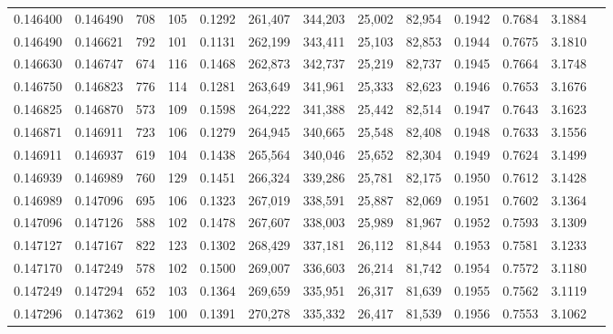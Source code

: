 \begin{tabular}{rrrrrrrrrrrrr}
0.146400 & 0.146490 &   708 & 105 &                                     0.1292 & 261,407 & 344,203 &  25,002 &  82,954 & 0.1942 & 0.7684 & 3.1884 \\
0.146490 & 0.146621 &   792 & 101 &                                     0.1131 & 262,199 & 343,411 &  25,103 &  82,853 & 0.1944 & 0.7675 & 3.1810 \\
0.146630 & 0.146747 &   674 & 116 &                                     0.1468 & 262,873 & 342,737 &  25,219 &  82,737 & 0.1945 & 0.7664 & 3.1748 \\
0.146750 & 0.146823 &   776 & 114 &                                     0.1281 & 263,649 & 341,961 &  25,333 &  82,623 & 0.1946 & 0.7653 & 3.1676 \\
0.146825 & 0.146870 &   573 & 109 &                                     0.1598 & 264,222 & 341,388 &  25,442 &  82,514 & 0.1947 & 0.7643 & 3.1623 \\
0.146871 & 0.146911 &   723 & 106 &                                     0.1279 & 264,945 & 340,665 &  25,548 &  82,408 & 0.1948 & 0.7633 & 3.1556 \\
0.146911 & 0.146937 &   619 & 104 &                                     0.1438 & 265,564 & 340,046 &  25,652 &  82,304 & 0.1949 & 0.7624 & 3.1499 \\
0.146939 & 0.146989 &   760 & 129 &                                     0.1451 & 266,324 & 339,286 &  25,781 &  82,175 & 0.1950 & 0.7612 & 3.1428 \\
0.146989 & 0.147096 &   695 & 106 &                                     0.1323 & 267,019 & 338,591 &  25,887 &  82,069 & 0.1951 & 0.7602 & 3.1364 \\
0.147096 & 0.147126 &   588 & 102 &                                     0.1478 & 267,607 & 338,003 &  25,989 &  81,967 & 0.1952 & 0.7593 & 3.1309 \\
0.147127 & 0.147167 &   822 & 123 &                                     0.1302 & 268,429 & 337,181 &  26,112 &  81,844 & 0.1953 & 0.7581 & 3.1233 \\
0.147170 & 0.147249 &   578 & 102 &                                     0.1500 & 269,007 & 336,603 &  26,214 &  81,742 & 0.1954 & 0.7572 & 3.1180 \\
0.147249 & 0.147294 &   652 & 103 &                                     0.1364 & 269,659 & 335,951 &  26,317 &  81,639 & 0.1955 & 0.7562 & 3.1119 \\
0.147296 & 0.147362 &   619 & 100 &                                     0.1391 & 270,278 & 335,332 &  26,417 &  81,539 & 0.1956 & 0.7553 & 3.1062 \\

\end{tabular}
